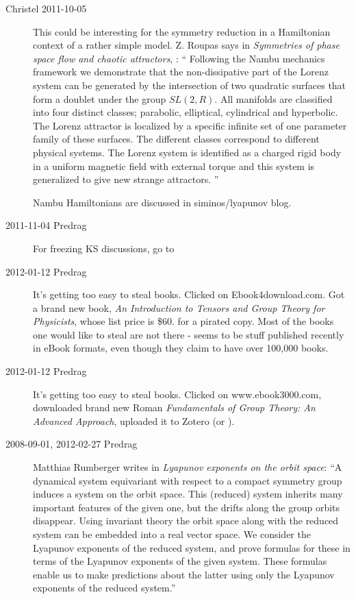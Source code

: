 \begin{description}
\item[Christel 2011-10-05 ] This could be interesting for the symmetry
reduction in a Hamiltonian context of a rather simple model.
Z. Roupas says in
\emph{Symmetries of phase space flow and chaotic attractors},
 : ``
Following the Nambu mechanics framework we demonstrate that the
non-dissipative part of the Lorenz system can be generated by the
intersection of two quadratic surfaces that form a doublet under the
group $SL(2,R)$. All manifolds are classified into four distinct classes;
parabolic, elliptical, cylindrical and hyperbolic. The Lorenz attractor
is localized by a specific infinite set of one parameter family of these
surfaces. The different classes correspond to different physical systems.
The Lorenz system is identified as a charged rigid body in a uniform
magnetic field with external torque and this system is generalized to
give new strange attractors.
''

Nambu Hamiltonians are discussed in siminos/lyapunov blog.

\item[2011-11-04 Predrag] For freezing KS discussions, go to

\item[2012-01-12 Predrag] It's getting too easy to steal books. Clicked on
{Ebook4download.com}. Got a brand new book, {\em An
Introduction to Tensors and Group Theory for Physicists}, whose list
price is \$60. 
for a pirated copy. Most of the books one would like to steal are not
there - seems to be stuff published recently in eBook formats, even though
they claim to have over 100,000 books.

\item[2012-01-12 Predrag] It's getting too easy to steal books. Clicked
on
{www.ebook3000.com}, downloaded brand new Roman {\em
Fundamentals of Group Theory: An Advanced Approach}, uploaded it to
Zotero (or ).

\item[2008-09-01, 2012-02-27 Predrag]
{Matthias Rumberger} writes in
{\emph{Lyapunov exponents on the orbit space}}:
``A dynamical system equivariant with respect to a compact symmetry
group induces a system on the orbit space. This (reduced) system
inherits many important features of the given one, but the drifts along the
group orbits disappear. Using invariant theory the orbit space along with the
reduced system can be embedded into a real vector space. We consider the
Lyapunov exponents of the reduced system, and prove formulas for these in
terms of the Lyapunov exponents of the given system. These formulas enable
us to make predictions about the latter using only the Lyapunov exponents of
the reduced system.''


\end{description}
